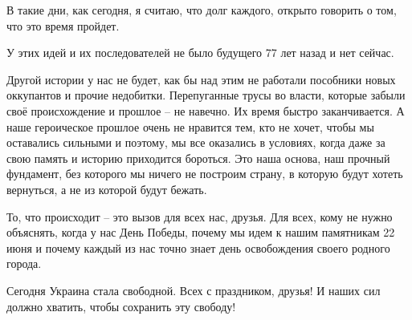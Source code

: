 В такие дни, как сегодня, я считаю, что долг каждого, открыто говорить о том,
что это время пройдет.

У этих идей и их последователей не было будущего 77 лет назад и нет сейчас.

Другой истории у нас не будет, как бы над этим не работали пособники новых
оккупантов и прочие недобитки. Перепуганные трусы во власти, которые забыли
своё происхождение и прошлое – не навечно. Их время быстро заканчивается. А
наше героическое прошлое очень не нравится тем, кто не хочет, чтобы мы
оставались сильными и поэтому, мы все оказались в условиях, когда даже за свою
память и историю приходится бороться. Это наша основа, наш прочный фундамент,
без которого мы ничего не построим страну, в которую будут хотеть вернуться, а
не из которой будут бежать.  

То, что происходит – это вызов для всех нас, друзья.  Для всех, кому не нужно
объяснять, когда у нас День Победы, почему мы идем к нашим памятникам 22 июня и
почему каждый из нас точно знает день освобождения своего родного города.

Сегодня Украина стала свободной. Всех с праздником, друзья! И наших сил должно
хватить, чтобы сохранить эту свободу!

